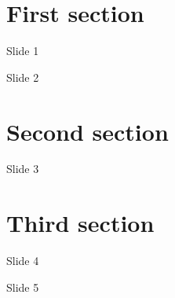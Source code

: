 \documentclass{beamer}
\begin{document}
	
	\section{First section}
	
	\begin{frame}{Slide 1}
	\end{frame}

	\begin{frame}{Slide 2}
	\end{frame}

	\section{Second section}

	\begin{frame}{Slide 3}
	\end{frame}

	\section{Third section}

	\begin{frame}{Slide 4}
	\end{frame}

	\begin{frame}{Slide 5}
	\end{frame}
	
\end{document}
